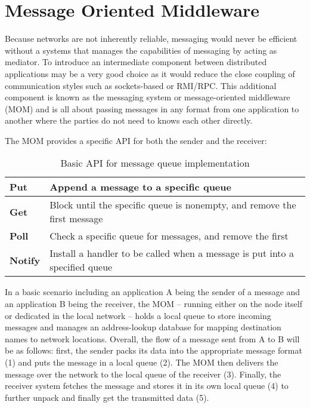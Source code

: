 \section{Message Oriented Middleware}
\label{intro-messaging-mom}

Because networks are not inherently reliable, messaging would never be
efficient without a systems that manages the capabilities of messaging by acting
as mediator. To introduce an intermediate component between distributed
applications may be a very good choice as it would reduce the close coupling of
communication styles such as sockets-based or RMI/RPC. This additional component
is known as the messaging system or message-oriented middleware (MOM) and is
all about passing messages in any format from one application to another where
the parties do not need to knows each other directly. \cite{TAN06} 

The MOM provides a specific API for both the sender and the receiver:

\begin{table}[H]
\centering
\begin{tabular}{|l|l|}
\hline
\textbf{Put}    & Append a message to a specific queue                                        \\ \hline
\textbf{Get}    & Block until the specific queue is nonempty, and remove the first message    \\ \hline
\textbf{Poll}   & Check a specific queue for messages, and remove the first                   \\ \hline
\textbf{Notify} & Install a handler to be called when a message is put into a specified queue \\ \hline
\end{tabular}
\caption{Basic API for message queue implementation \cite{TAN06}}
\end{table}

In a basic scenario including an application A being the sender of a message and
an application B being the receiver, the MOM -- running either on the node itself
or dedicated in the local network -- holds a local queue to store incoming
messages and manages an address-lookup database for mapping destination names to
network locations. Overall, the flow of a message sent from A to B will be as
follows: first, the sender packs its data into the appropriate message format
(1) and puts the message in a local queue (2). The MOM then delivers the message
over the network to the local queue of the receiver (3). Finally, the receiver
system fetches the message and stores it in its own local queue (4) to
further unpack and finally get the transmitted data (5).

